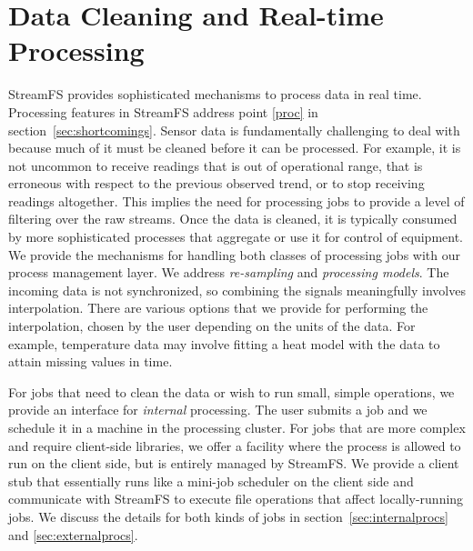 \section{Data Cleaning and Real-time Processing}

StreamFS provides sophisticated mechanisms to process data in real time.  Processing features in StreamFS address
point \ref{proc} in section~\ref{sec:shortcomings}.
Sensor data is fundamentally challenging to deal with because much of it must be cleaned before it can be processed.  For example,
it is not uncommon to receive readings that is out of operational range, that is erroneous with respect to the previous observed trend,
or to stop receiving readings altogether.  This implies the need for processing jobs to provide a level of filtering over the raw streams.
Once the data is cleaned, it is typically consumed by more sophisticated processes that aggregate or use it for control
of equipment.  We provide the mechanisms for handling both classes of processing jobs with our process management layer.
We address \emph{re-sampling} and \emph{processing models}.  The incoming data is not synchronized, 
so combining the signals meaningfully involves interpolation.  There are various options that we
provide for performing the interpolation, chosen by the user depending on the units of the data.  For example,
temperature data may involve fitting a heat model with the data to attain missing values in time.  

For jobs that need to clean the data or wish to run small, simple operations, we provide an interface for
\emph{internal} processing.  The user submits a job and we schedule it in a machine in the processing cluster.
For jobs that are more complex and require client-side libraries, we offer a facility where the process is allowed
to run on the client side, but is entirely managed by StreamFS.  We provide a client stub that essentially runs like a
mini-job scheduler on the client side and communicate with StreamFS to execute file operations that affect locally-running
jobs.  We discuss the details for both kinds of jobs in section~\ref{sec:internalprocs} and \ref{sec:externalprocs}.


